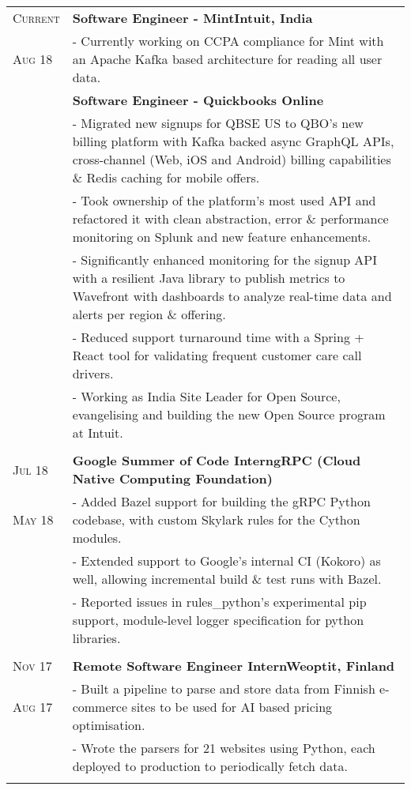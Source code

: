 \documentclass[a4paper,10pt]{extarticle} %
\begin{document}
\begin{tabularx}{\linewidth}{ l | X }

\textsc{Current} & \textbf{Software Engineer - Mint}\hfill\textbf{Intuit, India}\\
\textsc{Aug 18} & {- Currently working on CCPA compliance for Mint with an Apache Kafka based architecture for reading all user data.}\\
& \textbf{Software Engineer - Quickbooks Online}\\
& {- Migrated new signups for QBSE US to QBO's new billing platform with Kafka backed async GraphQL APIs, cross-channel (Web, iOS and Android) billing capabilities \& Redis caching for mobile offers.}\\
& {- Took ownership of the platform's most used API and refactored it with clean abstraction, error \& performance monitoring on Splunk and new feature enhancements.}\\
& {- Significantly enhanced monitoring for the signup API with a resilient Java library to publish metrics to Wavefront with dashboards to analyze real-time data and alerts per region \& offering.}\\
& {- Reduced support turnaround time with a Spring + React tool for validating frequent customer care call drivers.}\\
& {- Working as India Site Leader for Open Source, evangelising and building the new Open Source program at Intuit.}\\
\multicolumn{2}{c}{} \\

\textsc{Jul 18} & \textbf{Google Summer of Code Intern}\hfill\textbf{gRPC (Cloud Native Computing Foundation)}\\
\textsc{May 18}& {- Added Bazel support for building the gRPC Python codebase, with custom Skylark rules for the Cython modules.}\\
& {- Extended support to Google's internal CI (Kokoro) as well, allowing incremental build \& test runs with Bazel.}\\
& {- Reported issues in rules\_python's experimental pip support, module-level logger specification for python libraries.}\\
\multicolumn{2}{c}{} \\

\textsc{Nov 17} & \textbf{Remote Software Engineer Intern}\hfill\textbf{Weoptit, Finland}\\
\textsc{Aug 17}& {- Built a pipeline to parse and store data from Finnish e-commerce sites to be used for AI based pricing optimisation.}\\
& {- Wrote the parsers for 21 websites using Python, each deployed to production to periodically fetch data.}\\
\multicolumn{2}{c}{} \\


\end{tabularx}
\end{document}
